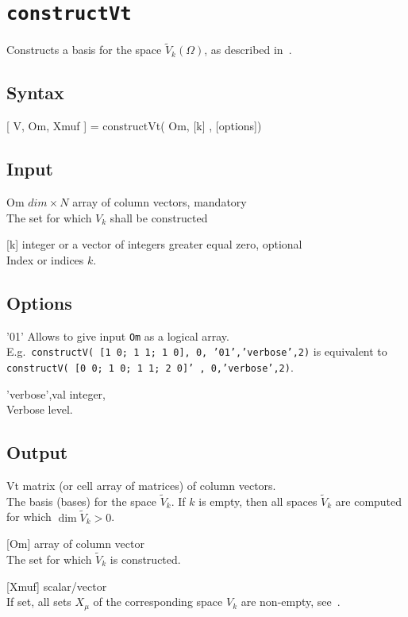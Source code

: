 \section{\texttt{constructVt}}
Constructs a basis for the space $\tilde{V}_k(\Omega)$, as described in~\cite{CM18}.

\subsection*{Syntax}
\begin{param}
\item[{[ V, Om, Xmuf ] = constructVt( Om, [k] , [options])}]
\end{param}

\subsection*{Input}
\begin{param}
\item[Om] $dim \times N$ array of column vectors, mandatory\\
The set for which $V_k$ shall be constructed
\item[{[k]}] integer or a vector of integers greater equal zero, optional\\
Index or indices $k$.

\end{param}

\subsection*{Options}
\begin{param}
    \item['01'] Allows to give input \texttt{Om} as a logical array.\\ 
    E.g.\ \texttt{constructV( [1 0; 1 1; 1 0], 0, '01','verbose',2)} is equivalent to \texttt{constructV( [0 0; 1 0; 1 1; 2 0]' , 0,'verbose',2)}.
    
    \item['verbose',val] integer, \\Verbose level.
    
\end{param}

\subsection*{Output}
\begin{param}
    \item[Vt] matrix (or cell array of matrices) of column vectors.\\
    The basis (bases) for the space $\tilde{V}_k$.
    If $k$ is empty, then all spaces $\tilde{V}_k$ are computed for which $\dim \tilde{V}_k>0$.
    \item[{[Om]}] array of column vector\\The set for which $\tilde{V}_k$ is constructed.
    \item[{[Xmuf]}] scalar/vector\\ 
    If set, all sets $X_\mu$ of the corresponding space $V_k$ are non-empty, see~\cite{Mej19}.    
\end{param}

